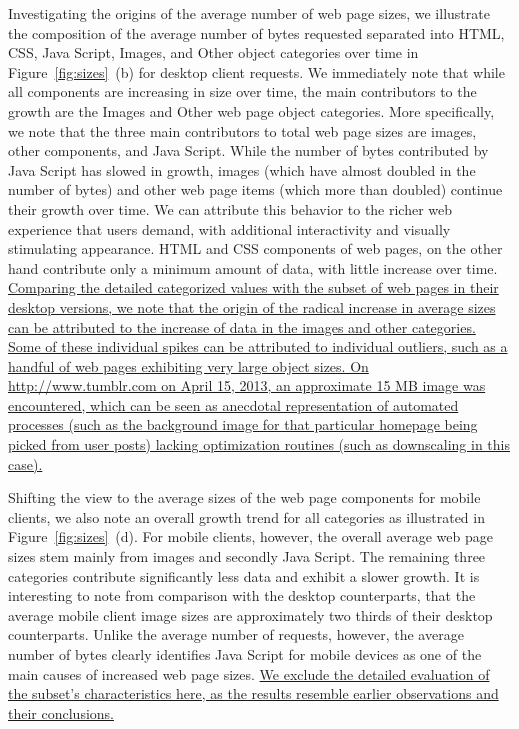\documentclass[onecolumn,12pt]{IEEEtran}
\begin{document}
Investigating the origins of the average number of web page sizes, we illustrate the composition of the average number of bytes requested separated into HTML, CSS, Java Script, Images, and Other object categories over time in Figure~\ref{fig:sizes}~(b) for desktop client requests.
We immediately note that while all components are increasing in size over time, the main contributors to the growth are the Images and Other web page object categories.
More specifically, we note that the three main contributors to total web page sizes are images, other components, and Java Script. 
While the number of bytes contributed by Java Script has slowed in growth, images (which have almost doubled in the number of bytes) and other web page items (which more than doubled) continue their growth over time.
We can attribute this behavior to the richer web experience that users demand, with additional interactivity and visually stimulating appearance.
HTML and CSS components of web pages, on the other hand contribute only a minimum amount of data, with little increase over time.
\uline{Comparing the detailed categorized values with the subset of web pages in their desktop versions, we note that the origin of the radical increase in average sizes can be attributed to the increase of data in the images and other categories.
Some of these individual spikes can be attributed to individual outliers, such as a handful of web pages exhibiting very large object sizes. On http://www.tumblr.com on April 15, 2013, an approximate 15 MB image was encountered, which can be seen as anecdotal representation of automated processes (such as the background image for that particular homepage being picked from user posts) lacking optimization routines (such as downscaling in this case).}


Shifting the view to the average sizes of the web page components for mobile clients, we also note an overall growth trend for all categories as illustrated in Figure~\ref{fig:sizes}~(d).
For mobile clients, however, the overall average web page sizes stem mainly from images and secondly Java Script. 
The remaining three categories contribute significantly less data and exhibit a slower growth.
It is interesting to note from comparison with the desktop counterparts, that the average mobile client image sizes are approximately two thirds of their desktop counterparts.
Unlike the average number of requests, however, the average number of bytes clearly identifies Java Script for mobile devices as one of the main causes of increased web page sizes. 
\uline{We exclude the detailed evaluation of the subset's characteristics here, as the results resemble earlier observations and their conclusions.}
\end{document}
